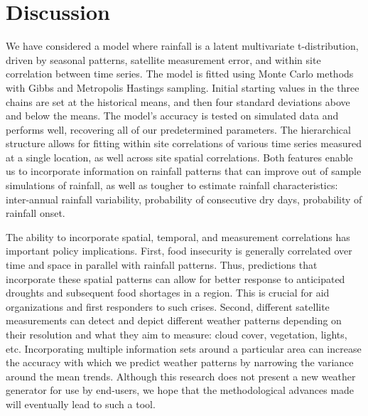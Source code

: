 \documentclass[11pt]{article}
\begin{document}


\section{Discussion}\label{sec:discussion}

We have considered a model where rainfall is a latent multivariate t-distribution, driven by seasonal patterns, satellite measurement error, and within site correlation between time series. The model is fitted using Monte Carlo methods with Gibbs and Metropolis Hastings sampling. Initial starting values in the three chains are set at the historical means, and then four standard deviations above and below the means. The model's accuracy is tested on simulated data and performs well, recovering all of our predetermined parameters. The hierarchical structure allows for fitting within site correlations of various time series measured at a single location, as well across site spatial correlations. Both features enable us to incorporate information on rainfall patterns that can improve out of sample simulations of rainfall, as well as tougher to estimate rainfall characteristics: inter-annual rainfall variability, probability of consecutive dry days, probability of rainfall onset.

The ability to incorporate spatial, temporal, and measurement correlations has important policy implications. First, food insecurity is generally correlated over time and space in parallel with rainfall patterns. Thus, predictions that incorporate these spatial patterns can allow for better response to anticipated droughts and subsequent food shortages in a region. This is crucial for aid organizations and first responders to such crises. Second, different satellite measurements can detect and depict different weather patterns depending on their resolution and what they aim to measure: cloud cover, vegetation, lights, etc. Incorporating multiple information sets around a particular area can increase the accuracy with which we predict weather patterns by narrowing the variance around the mean trends. Although this research does not present a new weather generator for use by end-users, we hope that the methodological advances made will eventually lead to such a tool. 
\end{document}
